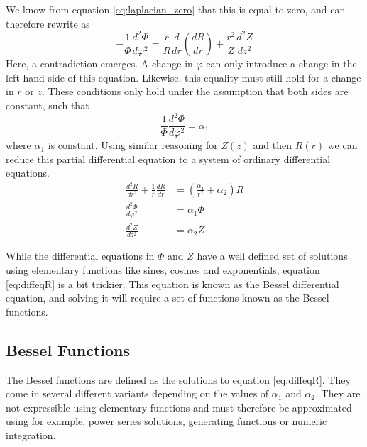 We know from equation \ref{eq:laplacian_zero} that this is equal to zero,
and can therefore rewrite as
\begin{equation}
    -\frac{1}{\varPhi} \frac{d^2 \varPhi}{d\varphi^2} =
    \frac{r}{R} \frac{d}{dr} \left(\frac{dR}{dr} \right)
    + \frac{r^2}{Z} \frac{d^2 Z}{dz^2}
\end{equation}
Here, a contradiction emerges. A change in $\varphi$ can only
introduce a change in the left hand side of this equation. Likewise,
this equality must still hold for a change in $r$ or $z$. These
conditions only hold under the assumption that both sides are constant,
such that
\begin{equation}
    \frac{1}{\varPhi} \frac{d^2 \varPhi}{d\varphi^2} = \alpha_1
\end{equation}
where $\alpha_1$ is constant. Using similar reasoning for $Z(z)$
and then $R(r)$ we can reduce this partial differential equation to
a system of ordinary differential equations.
\begin{align}
    \frac{d^2R}{dr^2} + \frac{1}{r} \frac{dR}{dr} & =
    \left( \frac{\alpha_1}{r^2} + \alpha_2 \right)R
    \label{eq:diffeqR}                                                \\
    \frac{d^2 \varPhi}{d\varphi^2}                & = \alpha_1\varPhi
    \label{eq:diffeqPhi}                                              \\
    \frac{d^2 Z}{dz^2}                            & = \alpha_2 Z
    \label{eq:diffeqZ}
\end{align}

While the differential equations in $\varPhi$ and $Z$ have a well defined
set of solutions using elementary functions like sines, cosines and exponentials,
equation \ref*{eq:diffeqR} is a bit trickier. This equation is known as
the Bessel differential equation, and solving it will require a
set of functions known as the Bessel functions. \cite{weisstein_bessel}

\subsection{Bessel Functions}
The Bessel functions are defined as the solutions to equation \ref*{eq:diffeqR}.
They come in several different variants depending on the values of $\alpha_1$ and
$\alpha_2$. They are not expressible using elementary functions and must therefore
be approximated using for example, power series solutions, generating functions
or numeric integration.

